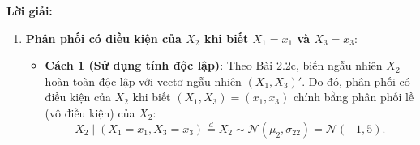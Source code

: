 \documentclass[11pt,a4paper]{article}
\newenvironment{solution}{%
  \par\noindent\textbf{Lời giải:}\ \ignorespaces
}{\par}
\theoremstyle{definition}
\newcommand{\answer}[1]{\boxed{#1}}
\begin{document}
\begin{solution}
\begin{enumerate}[label=\textbf{\alph*)}]
\begin{itemize}
\[    \]
    \item Kỳ vọng có điều kiện:
    \begin{align*}
      \mathbb{E}[X_1 \mid X_2 = x_2, X_3 = x_3] &= \boldsymbol{\mu}_1 + \boldsymbol{\Sigma}_{12}\boldsymbol{\Sigma}_{22}^{-1} \left( \begin{pmatrix} x_2 \\ x_3 \end{pmatrix} - \boldsymbol{\mu}_2 \right) \\
      &= 1 + \begin{pmatrix} 0 & -\frac{1}{2} \end{pmatrix} \begin{pmatrix} x_2 - (-1) \\ x_3 - 2 \end{pmatrix} \\
      &= 1 + 0 \cdot (x_2 + 1) - \frac{1}{2}(x_3 - 2) = 2 - \frac{1}{2}x_3.
    \end{align*}
    \item Phương sai có điều kiện:
    \begin{align*}
      \operatorname{Var}(X_1 \mid X_2 = x_2, X_3 = x_3) &= \boldsymbol{\Sigma}_{11} - \boldsymbol{\Sigma}_{12}\boldsymbol{\Sigma}_{22}^{-1}\boldsymbol{\Sigma}_{21} \\
      &= 4 - \begin{pmatrix} 0 & -\frac{1}{2} \end{pmatrix} \begin{pmatrix} 0 \\ -1 \end{pmatrix} = 4 - \frac{1}{2} = \frac{7}{2}.
    \end{align*}
    \item \textbf{Kết luận}:
    \[
    X_1 \mid (X_2 = x_2, X_3 = x_3) \sim \answer{\mathcal{N}\left( 2 - \tfrac{1}{2}x_3, \, \tfrac{7}{2} \right)}.
    \]
    \item \textit{Bình luận sâu sắc}: Kết quả ở câu b hoàn toàn trùng khớp với câu a. Điều này hoàn toàn tự nhiên vì ở Bài 2.2c, ta đã chứng minh $X_2$ độc lập với $(X_1, X_3)$. Khi $X_2$ độc lập với $(X_1, X_3)$, việc bổ sung thông tin $X_2 = x_2$ không mang lại bất kỳ thông tin nào về $X_1$, tức là:
    \[
    f(x_1 \mid x_2, x_3) = f(x_1 \mid x_3).
    \]
  \end{itemize}

  \item \textbf{Phân phối có điều kiện của $X_2$ khi biết $X_1 = x_1$ và $X_3 = x_3$}:
  \begin{itemize}
    \item \textbf{Cách 1 (Sử dụng tính độc lập)}:
    Theo Bài 2.2c, biến ngẫu nhiên $X_2$ hoàn toàn độc lập với vectơ ngẫu nhiên $(X_1, X_3)'$.
    Do đó, phân phối có điều kiện của $X_2$ khi biết $(X_1, X_3) = (x_1, x_3)$ chính bằng phân phối lề (vô điều kiện) của $X_2$:
    \[
    X_2 \mid (X_1 = x_1, X_3 = x_3) \stackrel{d}{=} X_2 \sim \mathcal{N}(\mu_2, \sigma_{22}) = \mathcal{N}(-1, 5).
    \]


\end{itemize}
\end{enumerate}
\end{solution}
\end{document}
